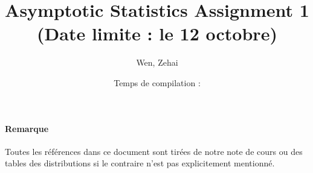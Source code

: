 \documentclass[../main.tex]{subfiles}
\title{Asymptotic Statistics Assignment 1 \\ (Date limite : le 12 octobre)}
\author{Wen, Zehai }
\date{Temps de compilation : \DTMnow}
\begin{document}
\maketitle

\paragraph{Remarque}
Toutes les références dans ce document sont tirées de notre note de cours ou 
des tables des distributions si le contraire n'est pas explicitement mentionné.



\end{document}
